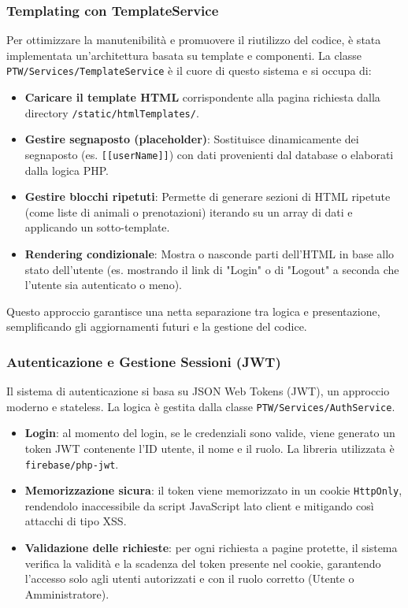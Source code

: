 \subsubsection{Templating con TemplateService}
Per ottimizzare la manutenibilità e promuovere il riutilizzo del codice, è stata implementata un'architettura basata su template e componenti. La classe \texttt{PTW/Services/TemplateService} è il cuore di questo sistema e si occupa di:
\begin{itemize}
    \item \textbf{Caricare il template HTML} corrispondente alla pagina richiesta dalla directory \texttt{/static/htmlTemplates/}.
    \item \textbf{Gestire segnaposto (placeholder)}: Sostituisce dinamicamente dei segnaposto (es. \texttt{[[userName]]}) con dati provenienti dal database o elaborati dalla logica PHP.
    \item \textbf{Gestire blocchi ripetuti}: Permette di generare sezioni di HTML ripetute (come liste di animali o prenotazioni) iterando su un array di dati e applicando un sotto-template.
    \item \textbf{Rendering condizionale}: Mostra o nasconde parti dell'HTML in base allo stato dell'utente (es. mostrando il link di "Login" o di "Logout" a seconda che l'utente sia autenticato o meno).
\end{itemize}
Questo approccio garantisce una netta separazione tra logica e presentazione, semplificando gli aggiornamenti futuri e la gestione del codice.

\subsubsection{Autenticazione e Gestione Sessioni (JWT)}
Il sistema di autenticazione si basa su JSON Web Tokens (JWT), un approccio moderno e stateless. La logica è gestita dalla classe \texttt{PTW/Services/AuthService}.
\begin{itemize}
    \item \textbf{Login}: al momento del login, se le credenziali sono valide, viene generato un token JWT contenente l'ID utente, il nome e il ruolo. La libreria utilizzata è \texttt{firebase/php-jwt}.
    \item \textbf{Memorizzazione sicura}: il token viene memorizzato in un cookie \texttt{HttpOnly}, rendendolo inaccessibile da script JavaScript lato client e mitigando così attacchi di tipo XSS.
    \item \textbf{Validazione delle richieste}: per ogni richiesta a pagine protette, il sistema verifica la validità e la scadenza del token presente nel cookie, garantendo l'accesso solo agli utenti autorizzati e con il ruolo corretto (Utente o Amministratore).
\end{itemize}

